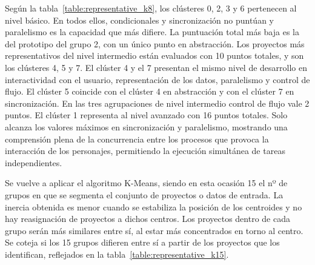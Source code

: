 \documentclass[a4paper, 12pt]{book}
\begin{document}
Según la tabla~\ref{table:representative_k8}, los clústeres 0, 2, 3 y 6 pertenecen al nivel básico. En todos ellos, condicionales y sincronización no puntúan y paralelismo es la capacidad que más difiere. La puntuación total más baja es la del prototipo del grupo 2, con un único punto en abstracción. Los proyectos más representativos del nivel intermedio están evaluados con 10 puntos totales, y son los clústeres 4, 5 y 7. El clúster 4 y el 7 presentan el mismo nivel de desarrollo en interactividad con el usuario, representación de los datos, paralelismo y control de flujo. El clúster 5 coincide con el clúster 4 en abstracción y con el clúster 7 en sincronización. En las tres agrupaciones de nivel intermedio control de flujo vale 2 puntos. El clúster 1 representa al nivel avanzado con 16 puntos totales. Solo alcanza los valores máximos en sincronización y paralelismo, mostrando una comprensión plena de la concurrencia entre los procesos que provoca la interacción de los personajes, permitiendo la ejecución simultánea de tareas independientes.

Se vuelve a aplicar el algoritmo K-Means, siendo en esta ocasión 15 el nº de grupos en que se segmenta el conjunto de proyectos o datos de entrada. La inercia obtenida es menor cuando se estabiliza la posición de los centroides y no hay reasignación de proyectos a dichos centros. Los proyectos dentro de cada grupo serán más similares entre sí, al estar más concentrados en torno al centro. Se coteja si los 15 grupos difieren entre sí a partir de los proyectos que los identifican, reflejados en la tabla~\ref{table:representative_k15}.
\end{document}
